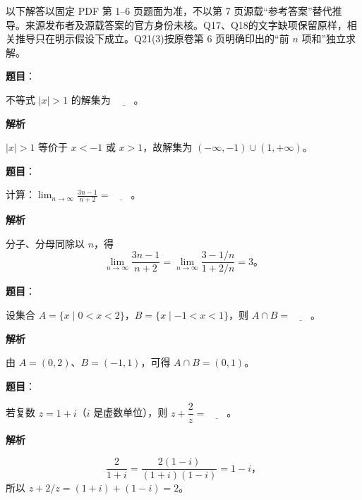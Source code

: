 

\begin{gktip}
以下解答以固定 PDF 第 1–6 页题面为准，不以第 7 页源载“参考答案”替代推导。来源发布者及源载答案的官方身份未核。Q17、Q18的文字缺项保留原样，相关推导只在明示假设下成立。Q21(3)按原卷第 6 页明确印出的“前 $n$ 项和”独立求解。
\end{gktip}

\begin{answer}

\textbf{题目}：

不等式 $|x|>1$ 的解集为 $\underline{\qquad}$。

\textbf{解析}

$|x|>1$ 等价于 $x<-1$ 或 $x>1$，故解集为 $(-\infty,-1)\cup(1,+\infty)$。


\end{answer}
\begin{answer}

\textbf{题目}：

计算：$\displaystyle\lim_{n\to\infty}\frac{3n-1}{n+2}=\underline{\qquad}$。

\textbf{解析}

分子、分母同除以 $n$，得
\nopagebreak[4]
\[
\lim_{n\to\infty}\frac{3n-1}{n+2}
=\lim_{n\to\infty}\frac{3-1/n}{1+2/n}=3\mbox{。}
\]


\end{answer}
\begin{answer}

\textbf{题目}：

设集合 $A=\{x\mid 0<x<2\}$，$B=\{x\mid -1<x<1\}$，则 $A\cap B=\underline{\qquad}$。

\textbf{解析}

由 $A=(0,2)$、$B=(-1,1)$，可得 $A\cap B=(0,1)$。


\end{answer}
\begin{answer}

\textbf{题目}：

若复数 $z=1+i$（$i$ 是虚数单位），则 $z+\dfrac{2}{z}=\underline{\qquad}$。

\textbf{解析}

\nopagebreak[4]
\[
\frac2{1+i}=\frac{2(1-i)}{(1+i)(1-i)}=1-i\text{，}
\]
所以 $z+2/z=(1+i)+(1-i)=2$。


\end{answer}
